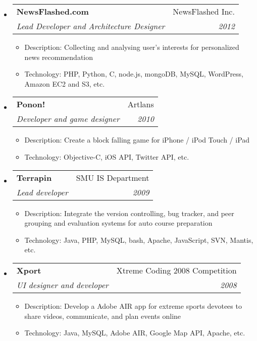 \documentclass[twoside,letterpaper,11pt]{article}
\makeatletter
\newcommand{\resitem}[1]{\item #1 \vspace{-5pt}}
\newcommand{\resheading}[1]{
  \parbox{\textwidth}{
    \begin{shaded}
      \textbf{\sffamily{\mbox{~}{\large #1} \vphantom{p\^{E}}}}
    \end{shaded}
  }\vspace{-6px}
}
\newcommand{\ressubheading}[4]{
\begin{tabular*}{7in}{l@{\extracolsep{\fill}}r}
		\textbf{#1} & #2 \\
		\textit{#3} & \textit{#4} \\
\end{tabular*}\vspace{-6pt}}
\makeatother
\begin{document}
\resheading{Projects}
\begin{itemize}
\item
	\ressubheading{NewsFlashed.com}{NewsFlashed Inc.}{Lead Developer and Architecture Designer}{2012}
	\begin{itemize}
		\resitem{Description: Collecting and analysing user's interests for personalized news recommendation}
		\resitem{Technology: PHP, Python, C, node.js, mongoDB, MySQL, WordPress, Amazon EC2 and S3, etc.}
	\end{itemize}

\item
	\ressubheading{Ponon!}{Artlans}{Developer and game designer}{2010}
	\begin{itemize}
		\resitem{Description: Create a block falling game for iPhone / iPod Touch / iPad}
		\resitem{Technology: Objective-C, iOS API, Twitter API, etc.}
	\end{itemize}

\item 
	\ressubheading{Terrapin}{SMU IS Department}{Lead developer}{2009}
	\begin{itemize}
		\resitem{Description: Integrate the version controlling, bug tracker, and peer grouping and evaluation systems for auto course preparation}
		\resitem{Technology: Java, PHP, MySQL, bash, Apache, JavaScript, SVN, Mantis, etc.}
	\end{itemize}

\item
	\ressubheading{Xport}{Xtreme Coding 2008 Competition}{UI designer and developer}{2008}
	\begin{itemize}
		\resitem{Description: Develop a Adobe AIR app for extreme sports devotees to share videos, communicate, and plan events online}
		\resitem{Technology: Java, MySQL, Adobe AIR, Google Map API, Apache, etc.}
	\end{itemize}


\end{itemize}
\end{document}
